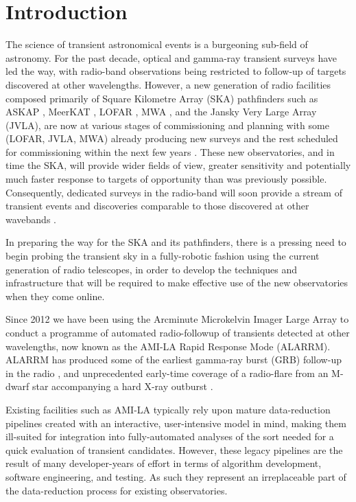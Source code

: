 \documentclass[5p,authoryear]{elsarticle}
\begin{document}
\section{Introduction}
\label{sec:intro}
The science of transient astronomical events is a burgeoning sub-field of astronomy. 
For the past decade, optical and gamma-ray transient surveys have led the way, with radio-band observations being restricted to follow-up of targets discovered at other wavelengths.
However, a new generation of radio facilities composed primarily of Square Kilometre Array (SKA) pathfinders such as 
ASKAP \citep[the Australian Square Kilometre Array Pathfinder;][]{Murphy2013},
MeerKAT \citep[Karoo Array Telescope;][]{Booth2012}, 
LOFAR \citep[the Low Frequency Array;][]{vanHaarlem2013}, 
MWA \citep[Murchison Widefield Array;][]{Tingay2013,Bell2014}, 
and the Jansky Very Large Array (JVLA), are now at various stages of commissioning and planning with some (LOFAR, JVLA, MWA) already producing new surveys and the rest scheduled for commissioning within the next few years \citep[see e.g.][for an overiew]{Norris2013}.
These new observatories, and in time the SKA, will provide wider fields of view, 
greater sensitivity and potentially much faster response to targets of opportunity than was previously possible. 
Consequently, dedicated surveys in the radio-band will soon provide a stream of transient events and discoveries comparable to those discovered at other wavebands \citep{Burlon2015,Corbel2015,Macquart2015,Stappers2013}.

In preparing the way for the SKA and its pathfinders, there is a pressing
need to begin probing the transient sky in a fully-robotic fashion 
using the current generation of radio telescopes, in order to develop the 
techniques and infrastructure that will be required to make effective use of the
new observatories when they come online.  

Since 2012 we have been using the Arcminute Microkelvin Imager Large Array \citep[AMI-LA,][]{Zwart2008} to conduct a programme of automated radio-followup of transients detected at other wavelengths, now known as the AMI-LA Rapid Response Mode (ALARRM).
ALARRM has produced some of the earliest 
gamma-ray burst (GRB) follow-up in the radio \citep{Staley2013,Anderson2014},
and unprecedented early-time coverage of a radio-flare from an M-dwarf
star accompanying a hard X-ray outburst \citep{Fender2015}.

Existing facilities such as AMI-LA typically rely upon mature data-reduction pipelines created with an interactive, user-intensive model in mind, making them ill-suited for integration into fully-automated analyses of the sort needed for a quick evaluation of transient candidates. 
However, these legacy pipelines are the result of many developer-years of effort in terms of algorithm development, software engineering, and testing.
As such they represent an irreplaceable part of the data-reduction process for existing observatories. 
\end{document}
